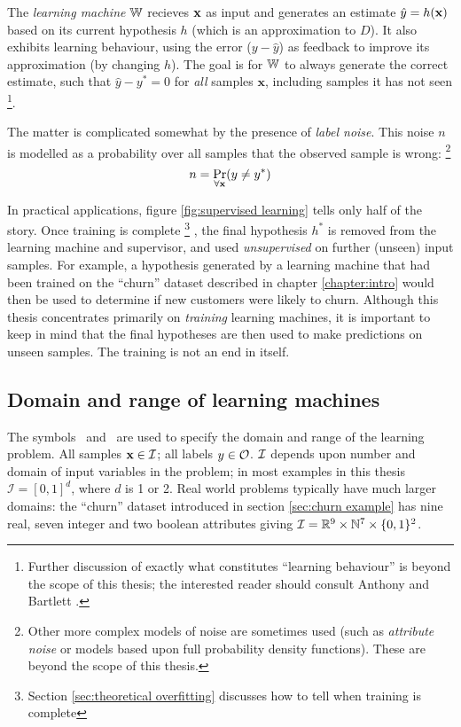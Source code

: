 The \emph{learning machine} $\mathbb{W}$ recieves $\mathbf{x}$ as input and
generates an estimate $\hat{y} = h(\mathbf{x})$ based on its current
hypothesis $h$ (which is an approximation to $D$).  It also exhibits
learning behaviour, using the error ($y - \hat{y}$) as feedback to
improve its approximation (by changing $h$).  The goal is for $\mathbb{W}$
to always generate the correct estimate, such that $\hat{y} - y^{\ast}
= 0$ for \emph{all} samples $\mathbf{x}$, including samples it has not
seen%
\footnote{Further discussion of exactly what constitutes ``learning
behaviour'' is beyond the scope of this thesis; the interested reader
should consult Anthony and Bartlett \cite{Anthony98}.}.

The matter is complicated somewhat by the presence of \emph{label
noise}.  This noise $n$ is modelled as a probability over all samples
that the observed sample is wrong:
\footnote{Other more complex models of noise are sometimes used (such
as \emph{attribute noise} or models based upon full probability
density functions).  These are beyond the scope of this thesis.}
%
\begin{equation}
n = \Pr_{\forall \mathbf{x}}(y \neq y^{\ast})
\end{equation}

In practical applications, figure \ref{fig:supervised learning} tells
only half of the story.  Once training is complete%
\footnote{Section \ref{sec:theoretical overfitting} discusses how to
tell when training is complete}%
, the final hypothesis $h^{\ast}$ is removed from the learning machine
and supervisor, and used \emph{unsupervised} on further (unseen) input
samples.  For example, a hypothesis generated by a learning machine
that had been trained on the ``churn'' dataset described in chapter
\ref{chapter:intro} would then be used to determine if new customers
were likely to churn.  Although this thesis concentrates primarily on
\emph{training} learning machines, it is important to keep in mind that
the final hypotheses are then used to make predictions on unseen
samples.  The training is not an end in itself.


\subsection{Domain and range of learning machines}
\label{sec:domain and range}

The symbols \calI\ and \calO\ are used to specify the domain and
range of the learning problem.  All samples $\mathbf{x} \in \mathcal{I}$; all
labels $y \in \mathcal{O}$.  $\mathcal{I}$ depends upon number and
domain of input variables in the problem; in most examples in this
thesis $\mathcal{I} = [0,1]^d$, where $d$ is 1 or 2.  Real world
problems typically have much larger domains: the ``churn'' dataset
introduced in section \ref{sec:churn example} has nine real, seven
integer and two boolean attributes giving $\mathcal{I} = \mathbb{R}^9 \times \mathbb{N}^7
\times \{0, 1\}^2$.

